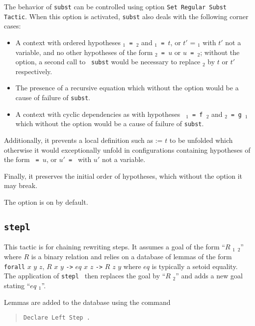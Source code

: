 \begin{coq_example*}
\begin{Variants}
 The behavior of {\tt subst} can be controlled
using option {\tt Set Regular Subst Tactic}. When this option is
activated, {\tt subst} also deals with the following corner cases:
\begin{itemize}
\item A context with ordered hypotheses {\tt \ident$_1$ = \ident$_2$}
  and {\tt \ident$_1$ = $t$}, or {$t'$ = \ident$_1$} with $t'$ not a
  variable, and no other hypotheses of the form {\tt \ident$_2$ = $u$}
  or {\tt $u$ = \ident$_2$}; without the option, a second call to {\tt
    subst} would be necessary to replace {\ident$_2$} by $t$ or $t'$
  respectively.

\item The presence of a recursive equation which without the option
  would be a cause of failure of {\tt subst}.
  
\item A context with cyclic dependencies as with hypotheses {\tt
  \ident$_1$ = f~\ident$_2$} and {\tt \ident$_2$ = g~\ident$_1$} which
  without the option would be a cause of failure of {\tt subst}.
\end{itemize}
Additionally, it prevents a local definition such as {\tt \ident} :=
  $t$ to be unfolded which otherwise it would exceptionally unfold in
configurations containing hypotheses of the form {\tt {\ident} = $u$},
or {\tt $u'$ = \ident} with $u'$ not a variable.

Finally, it preserves the initial order of hypotheses, which without
the option it may break.

The option is on by default.

\end{Variants}

\subsection{\tt stepl \term}

This tactic is for chaining rewriting steps. It assumes a goal of the
form ``$R$ {\term}$_1$ {\term}$_2$'' where $R$ is a binary relation
and relies on a database of lemmas of the form {\tt forall} $x$ $y$
$z$, $R$ $x$ $y$ {\tt ->} $eq$ $x$ $z$ {\tt ->} $R$ $z$ $y$ where $eq$
is typically a setoid equality. The application of {\tt stepl {\term}}
then replaces the goal by ``$R$ {\term} {\term}$_2$'' and adds a new
goal stating ``$eq$ {\term} {\term}$_1$''.

Lemmas are added to the database using the command
\begin{quote}
{\tt Declare Left Step {\term}.}
\end{quote}


\end{coq_example*}
